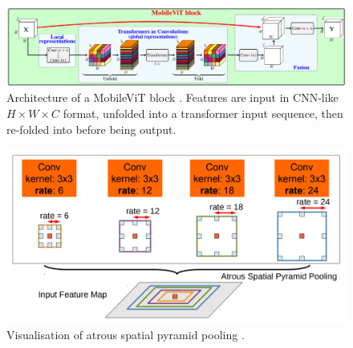 \documentclass[a4paper,12pt]{report}
\begin{document}

\begin{figure}[ht!]
    \centering
    \includegraphics[width=\textwidth]{res/mobilevit-block.png}
    \caption{Architecture of a MobileViT block \cite{mehta_mobilevit_2022}. Features are input in CNN-like $H \times W \times C$ format, unfolded into a transformer input sequence, then re-folded into before being output.}
    \label{fig:mobilevit_block}
\end{figure}


\begin{figure}[t]
    \centering
    \includegraphics[scale=0.5]{res/deeplab-aspp.png}
    \caption{Visualisation of atrous spatial pyramid pooling \cite{chen_deeplab_2017}.}
    \label{fig:deeplab_aspp}
\end{figure}
\end{document}
